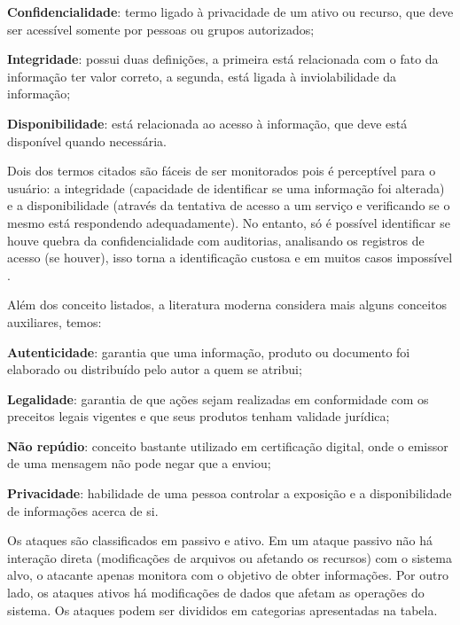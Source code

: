 \begin{alineas}
 \item \textbf{Confidencialidade}: termo ligado à privacidade de um ativo ou recurso, que deve ser acessível somente por pessoas ou grupos autorizados;
 \item \textbf{Integridade}: possui duas definições, a primeira está relacionada com o fato da informação ter valor correto, a segunda, está ligada à inviolabilidade da informação;
 \item \textbf{Disponibilidade}: está relacionada ao acesso à informação, que deve está disponível quando necessária.
\end{alineas}

Dois dos termos citados são fáceis de ser monitorados pois é perceptível para o usuário: a integridade (capacidade de identificar se uma informação foi alterada) e a disponibilidade (através da tentativa de acesso a um serviço e verificando se o mesmo está respondendo adequadamente). No entanto, só é possível identificar se houve quebra da confidencialidade com auditorias, analisando os registros de acesso (se houver), isso torna a identificação custosa e em muitos casos impossível \cite{seg-redes-sistemas}.

Além dos conceito listados, a literatura moderna considera mais alguns conceitos auxiliares, temos:

\begin{alineas}
 \item \textbf{Autenticidade}: garantia que uma informação, produto ou documento foi elaborado ou distribuído pelo autor a quem se atribui;
 \item \textbf{Legalidade}: garantia de que ações sejam realizadas em conformidade com os preceitos legais vigentes e que seus produtos tenham validade jurídica;
 \item \textbf{Não repúdio}: conceito bastante utilizado em certificação digital, onde o emissor de uma mensagem não pode negar que a enviou;
 \item \textbf{Privacidade}: habilidade de uma pessoa controlar a exposição e a disponibilidade de informações acerca de si.
\end{alineas}

Os ataques são classificados em passivo e ativo. Em um ataque passivo não há interação direta (modificações de arquivos ou afetando os recursos) com o sistema alvo, o atacante apenas monitora com o objetivo de obter informações. Por outro lado, os ataques ativos há modificações de dados que afetam as operações do sistema. Os ataques podem ser divididos em categorias apresentadas na tabela.

